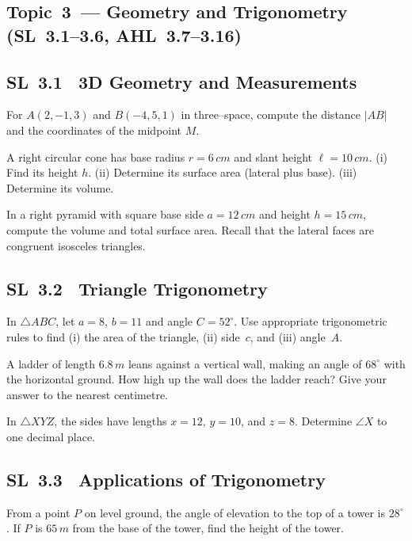 \documentclass[11pt]{article}
\def\mathrm#1{#1}%
\newcommand{\tocsubsection}[1]{\subsection{#1}}
\newcounter{question}
\begin{document}
\tocsubsection{Topic 3 — Geometry and Trigonometry (SL 3.1–3.6, AHL 3.7–3.16)}

\tocsubsection{SL 3.1 \; 3D Geometry and Measurements}

\begin{question}
For $A(2,-1,3)$ and $B(-4,5,1)$ in three–space, compute the distance $|AB|$ and
the coordinates of the midpoint $M$.
\end{question}

\begin{question}
A right circular cone has base radius $r=6\,\mathrm{cm}$ and slant height
\(\ell=10\,\mathrm{cm}\).  (i) Find its height $h$.  (ii) Determine its
surface area (lateral plus base).  (iii) Determine its volume.
\end{question}

\begin{question}
In a right pyramid with square base side $a=12\,\mathrm{cm}$ and height
$h=15\,\mathrm{cm}$, compute the volume and total surface area.  Recall that
the lateral faces are congruent isosceles triangles.
\end{question}

\tocsubsection{SL 3.2 \; Triangle Trigonometry}

\begin{question}
In $\triangle ABC$, let $a=8$, $b=11$ and angle $C=52^{\circ}$.  Use
appropriate trigonometric rules to find (i) the area of the triangle,
(ii) side~$c$, and (iii) angle~$A$.
\end{question}

\begin{question}
A ladder of length $6.8\,\mathrm{m}$ leans against a vertical wall, making an
angle of $68^{\circ}$ with the horizontal ground.  How high up the wall does
the ladder reach?  Give your answer to the nearest centimetre.
\end{question}

\begin{question}
In $\triangle XYZ$, the sides have lengths $x=12$, $y=10$, and $z=8$.
Determine $\angle X$ to one decimal place.
\end{question}

\tocsubsection{SL 3.3 \; Applications of Trigonometry}

\begin{question}
From a point $P$ on level ground, the angle of elevation to the top of a
tower is $28^{\circ}$.  If $P$ is $65\,\mathrm{m}$ from the base of the tower,
find the height of the tower.
\end{question}
\end{document}
